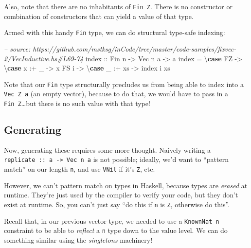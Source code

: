 \documentclass[]{article}
\newenvironment{Shaded}{}{}
\newcommand{\KeywordTok}[1]{\textcolor[rgb]{0.00,0.44,0.13}{\textbf{#1}}}
\newcommand{\DataTypeTok}[1]{\textcolor[rgb]{0.56,0.13,0.00}{#1}}
\newcommand{\CommentTok}[1]{\textcolor[rgb]{0.38,0.63,0.69}{\textit{#1}}}
\newcommand{\OtherTok}[1]{\textcolor[rgb]{0.00,0.44,0.13}{#1}}
\newcommand{\FunctionTok}[1]{\textcolor[rgb]{0.02,0.16,0.49}{#1}}
\newcommand{\NormalTok}[1]{#1}
\begin{document}
Also, note that there are no inhabitants of \texttt{Fin\ \textquotesingle{}Z}.
There is no constructor or combination of constructors that can yield a value of
that type.

Armed with this handy \texttt{Fin} type, we can do structural type-safe
indexing:

\begin{Shaded}
\begin{Highlighting}[]
\CommentTok{-- source: https://github.com/mstksg/inCode/tree/master/code-samples/fixvec-2/VecInductive.hs#L69-74}
\NormalTok{index}\OtherTok{ ::} \DataTypeTok{Fin}\NormalTok{ n }\OtherTok{->} \DataTypeTok{Vec}\NormalTok{ n a }\OtherTok{->}\NormalTok{ a}
\NormalTok{index }\FunctionTok{=}\NormalTok{ \textbackslash{}}\KeywordTok{case}
    \DataTypeTok{FZ} \OtherTok{->}\NormalTok{ \textbackslash{}}\KeywordTok{case}
\NormalTok{      x }\FunctionTok{:+}\NormalTok{ _ }\OtherTok{->}\NormalTok{ x}
    \DataTypeTok{FS}\NormalTok{ i }\OtherTok{->}\NormalTok{ \textbackslash{}}\KeywordTok{case}
\NormalTok{      _ }\FunctionTok{:+}\NormalTok{ xs }\OtherTok{->}\NormalTok{ index i xs}
\end{Highlighting}
\end{Shaded}

Note that our \texttt{Fin} type structurally precludes us from being able to
index into a \texttt{Vec\ \textquotesingle{}Z\ a} (an empty vector), because to
do that, we would have to pass in a \texttt{Fin\ \textquotesingle{}Z}\ldots{}but
there is no such value with that type!

\subsection{Generating}\label{generating-1}

Now, generating these requires some more thought. Naively writing a
\texttt{replicate\ ::\ a\ -\textgreater{}\ Vec\ n\ a} is not possible; ideally,
we'd want to ``pattern match'' on our length \texttt{n}, and use \texttt{VNil}
if it's \texttt{\textquotesingle{}Z}, etc.

However, we can't pattern match on types in Haskell, because types are
\emph{erased} at runtime. They're just used by the compiler to verify your code,
but they don't exist at runtime. So, you can't just say ``do this if \texttt{n}
is \texttt{\textquotesingle{}Z}, otherwise do this''.

Recall that, in our previous vector type, we needed to use a
\texttt{KnownNat\ n} constraint to be able to \emph{reflect} a \texttt{n} type
down to the value level. We can do something similar using the \emph{singletons}
machinery!
\end{document}
